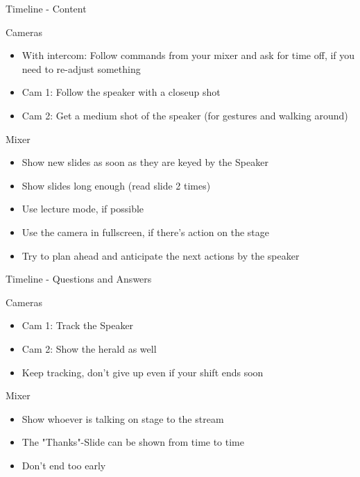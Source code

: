 \begin{frame}{Timeline - Content}
	\begin{block}{Cameras}
		\begin{itemize}
			\item With intercom: Follow commands from your mixer and ask for time off, if you need to re-adjust something
			\item Cam 1: Follow the speaker with a closeup shot
			\item Cam 2: Get a medium shot of the speaker (for gestures and walking around)
		\end{itemize}
	\end{block}
	\begin{block}{Mixer}
		\begin{itemize}
			\item Show new slides as soon as they are keyed by the Speaker 
			\item Show slides long enough (read slide 2 times)
			\item Use lecture mode, if possible
			\item Use the camera in fullscreen, if there's action on the stage
			\item Try to plan ahead and anticipate the next actions by the speaker
		\end{itemize}
	\end{block}
\end{frame}

\begin{frame}{Timeline - Questions and Answers}
	\begin{block}{Cameras}
		\begin{itemize}
			\item Cam 1: Track the Speaker
			\item Cam 2: Show the herald as well
			\item Keep tracking, don't give up even if your shift ends soon
		\end{itemize}
	\end{block}
	\begin{block}{Mixer}
		\begin{itemize}
			\item Show whoever is talking on stage to the stream
			\item The "Thanks"-Slide can be shown from time to time
			\item Don't end too early
		\end{itemize}
	\end{block}
\end{frame}
